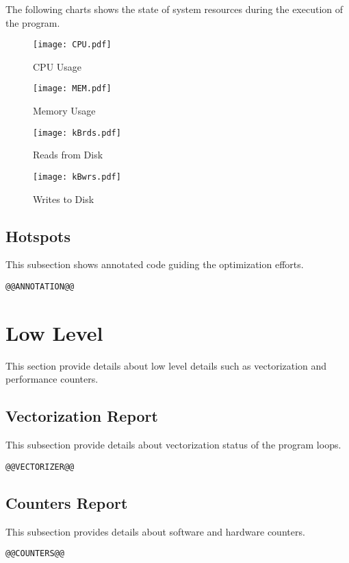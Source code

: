 \documentclass[a4paper]{article}
\begin{document}
The following charts shows the state of system resources during the execution of the program.

\begin{figure}[H]
\label{fig:cpu}
\centering
\texttt{[image: CPU.pdf]}
\caption{CPU Usage}
\end{figure}

\begin{figure}[H]
\label{fig:memory}
\centering
\texttt{[image: MEM.pdf]}
\caption{Memory Usage}
\end{figure}

\begin{figure}[H]
\label{fig:reads}
\centering
\texttt{[image: kBrds.pdf]}
\caption{Reads from Disk}
\end{figure}

\begin{figure}[H]
\label{fig:writes}
\centering
\texttt{[image: kBwrs.pdf]}
\caption{Writes to Disk}
\end{figure}

\subsection{Hotspots}

This subsection shows annotated code guiding the optimization efforts.

\begin{verbatim}
@@ANNOTATION@@
\end{verbatim}

\section{Low Level}

This section provide details about low level details such as vectorization and performance counters.

\subsection{Vectorization Report}

This subsection provide details about vectorization status of the program loops.

\begin{verbatim}
@@VECTORIZER@@
\end{verbatim}

\subsection{Counters Report}

This subsection provides details about software and hardware counters.

\begin{verbatim}
@@COUNTERS@@
\end{verbatim}
\end{document}
